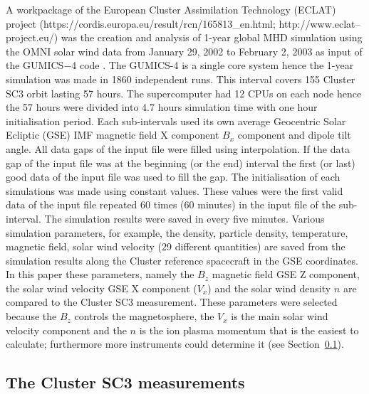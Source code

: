 \documentclass[linenumbers,draft]{agujournal}
\begin{document}
A workpackage of the European Cluster Assimilation Technology (ECLAT) project (https://cordis.europa.eu/result/rcn/165813\_en.html; http://www.eclat--project.eu/) was the creation and analysis of 1-year global MHD simulation using the OMNI solar wind data  from January 29, 2002 to February 2, 2003 as input of the GUMICS$-$4 code \citep{facsko16:_one_earth}. The GUMICS-4 is a single core system \citep{janhunen12:_gumic_mhd} hence the 1-year simulation was made in 1860 independent runs. This interval covers 155 Cluster SC3 orbit lasting 57 hours. The supercomputer had 12 CPUs on each node hence the 57 hours were divided into 4.7 hours simulation time with one hour initialisation period. Each sub-intervals used its own average Geocentric Solar Ecliptic (GSE) IMF magnetic field X component $B_x$ component and dipole tilt angle. All data gaps of the input file were filled using interpolation. If the data gap of the input file was at the beginning (or the end) interval the first (or last) good data of the input file was used to fill the gap. The initialisation of each simulations was made using constant values. These values were the first valid data of the input file repeated 60 times (60 minutes) in the input file of the sub-interval. The simulation results were saved in every five minutes. Various simulation parameters, for example, the density, particle density, temperature, magnetic field, solar wind velocity (29 different quantities) are saved from the simulation results along the Cluster reference spacecraft in the GSE coordinates. In this paper these parameters, namely the $B_z$ magnetic field GSE Z component, the solar wind velocity GSE X component ($V_x$) and the solar wind density $n$ are compared to the Cluster SC3 measurement. These parameters were selected because the $B_z$ controls the magnetosphere, the $V_x$ is the main solar wind velocity component and the $n$ is the ion plasma momentum that is the easiest to calculate; furthermore more instruments could determine it (see Section~\ref{sec:cluster}).

\subsection{The Cluster SC3 measurements}
\label{sec:cluster}
\end{document}
